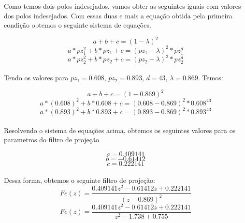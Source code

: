 \documentclass[a4paper,12pt]{article}
\begin{document}
Como temos dois polos indesejados, vamos obter as seguintes iguais com valores dos polos indesejados. Com essas duas e mais a equação obtida pela primeira condição obtemos o seguinte sistema de equações.

\begin{equation}
a + b + c = (1 - \lambda)^2
\end{equation}
\begin{equation}
a * pz^2_1 + b * pz_1 + c = (pz_1 - \lambda)^2 * pz^d_1
\end{equation}
\begin{equation}
a * pz^2_2 + b * pz_2 + c = (pz_2 - \lambda)^2 * pz^d_2
\end{equation}\\


Tendo os valores para \(pz_1 = 0.608\), \(pz_2 = 0.893\), \(d = 43\), \(\lambda = 0.869\). Temos:


\begin{equation}
a + b + c = (1 - 0.869)^2
\end{equation}
\begin{equation}
a * (0.608)^2 + b * 0.608  + c = (0.608 - 0.869)^2 * 0.608^{43}
\end{equation}
\begin{equation}
a * (0.893)^2 + b * 0.893  + c = (0.893 - 0.869)^2 * 0.893^{43}
\end{equation}\\

Resolvendo o sistema de equações acima, obtemos os seguintes valores para os parametros do filtro de projeção

\begin{equation}
a =  0.409141
\end{equation}
\begin{equation}
b = -0.61412
\end{equation}
\begin{equation}
c = 0.222141
\end{equation}\\

Dessa forma, obtemos o seguinte filtro de projeção:\\

\begin{equation}
Fe(z) = \frac{0.409141z^2 - 0.61412z + 0.222141}{(z-0.869)^2}
\end{equation}
\begin{equation}
Fe(z) = \frac{0.409141z^2 - 0.61412z + 0.222141}{z^2 - 1.738 + 0.755}
\end{equation}\\
\end{document}
